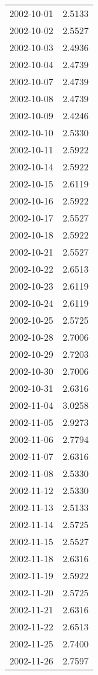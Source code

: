 \begin{tabular}{lr}
2002-10-01 &      2.5133 \\
2002-10-02 &      2.5527 \\
2002-10-03 &      2.4936 \\
2002-10-04 &      2.4739 \\
2002-10-07 &      2.4739 \\
2002-10-08 &      2.4739 \\
2002-10-09 &      2.4246 \\
2002-10-10 &      2.5330 \\
2002-10-11 &      2.5922 \\
2002-10-14 &      2.5922 \\
2002-10-15 &      2.6119 \\
2002-10-16 &      2.5922 \\
2002-10-17 &      2.5527 \\
2002-10-18 &      2.5922 \\
2002-10-21 &      2.5527 \\
2002-10-22 &      2.6513 \\
2002-10-23 &      2.6119 \\
2002-10-24 &      2.6119 \\
2002-10-25 &      2.5725 \\
2002-10-28 &      2.7006 \\
2002-10-29 &      2.7203 \\
2002-10-30 &      2.7006 \\
2002-10-31 &      2.6316 \\
2002-11-04 &      3.0258 \\
2002-11-05 &      2.9273 \\
2002-11-06 &      2.7794 \\
2002-11-07 &      2.6316 \\
2002-11-08 &      2.5330 \\
2002-11-12 &      2.5330 \\
2002-11-13 &      2.5133 \\
2002-11-14 &      2.5725 \\
2002-11-15 &      2.5527 \\
2002-11-18 &      2.6316 \\
2002-11-19 &      2.5922 \\
2002-11-20 &      2.5725 \\
2002-11-21 &      2.6316 \\
2002-11-22 &      2.6513 \\
2002-11-25 &      2.7400 \\
2002-11-26 &      2.7597 \\

\end{tabular}
